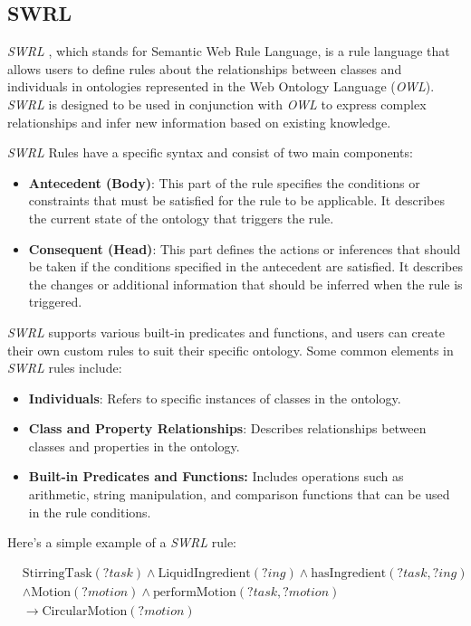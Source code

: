 	\subsection{SWRL}
	\label{sec:SWRL}
	\textit{SWRL} \cite{Horrocks2004}, which stands for Semantic Web Rule Language, is a rule language that allows users to define rules about the relationships between classes and individuals in ontologies represented in the Web Ontology Language (\textit{OWL}). \textit{SWRL} \cite{Horrocks2004} is designed to be used in conjunction with \textit{OWL} to express complex relationships and infer new information based on existing knowledge.

	\textit{SWRL} \cite{Horrocks2004} Rules have a specific syntax and consist of two main components:
	\begin{itemize}
		\item \textbf{Antecedent (Body)}: This part of the rule specifies the conditions or constraints that must be satisfied for the rule to be applicable. It describes the current state of the ontology that triggers the rule.
		\item \textbf{Consequent (Head)}: This part defines the actions or inferences that should be taken if the conditions specified in the antecedent are satisfied. It describes the changes or additional information that should be inferred when the rule is triggered.
	\end{itemize}
	\textit{SWRL} \cite{Horrocks2004} supports various built-in predicates and functions, and users can create their own custom rules to suit their specific ontology. Some common elements in \textit{SWRL} \cite{Horrocks2004} rules include:
	\begin{itemize}
		\item \textbf{Individuals}: Refers to specific instances of classes in the ontology.
		\item \textbf{Class and Property Relationships}: Describes relationships between classes and properties in the ontology.
		\item \textbf{Built-in Predicates and Functions:} Includes operations such as arithmetic, string manipulation, and comparison functions that can be used in the rule conditions.
	\end{itemize}

	Here's a simple example of a \textit{SWRL} \cite{Horrocks2004} rule:
	
	\[
	\begin{aligned}
	&\text{StirringTask}(?task) \land \text{LiquidIngredient}(?ing) \land \text{hasIngredient}(?task, ?ing)\\
	&\land \text{Motion}(?motion) \land \text{performMotion}(?task, ?motion)\\
	&\rightarrow \text{CircularMotion}(?motion)
	\end{aligned}
	\]
	
